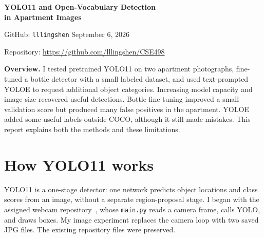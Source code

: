 \documentclass[10pt,letterpaper]{article}
\begin{document}
{\LARGE\bfseries YOLO11 and Open-Vocabulary Detection\\[2pt] in Apartment Images\par}
{\small GitHub: \texttt{lllingshen} \hfill September 6, 2026}\par
{\small Repository: \url{https://github.com/lllingshen/CSE498}}

\textbf{Overview.} I tested pretrained YOLO11 on two apartment photographs, fine-tuned a bottle detector with a small labeled dataset, and used text-prompted YOLOE to request additional object categories. Increasing model capacity and image size recovered useful detections. Bottle fine-tuning improved a small validation score but produced many false positives in the apartment. YOLOE added some useful labels outside COCO, although it still made mistakes. This report explains both the methods and these limitations.

\section{How YOLO11 works}
YOLO11 is a one-stage detector: one network predicts object locations and class scores from an image, without a separate region-proposal stage. I began with the assigned webcam repository~\cite{upstream}, whose \texttt{main.py} reads a camera frame, calls YOLO, and draws boxes. My image experiment replaces the camera loop with two saved JPG files. The existing repository files were preserved.

\begin{center}
\end{center}
\end{document}
